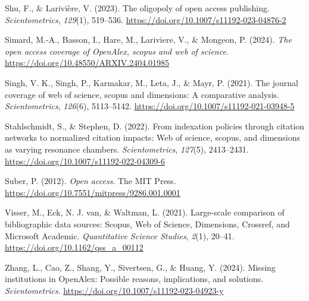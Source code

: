 \documentclass[a4paper,man,floatsintext,longtable,noextraspace,10pt]{apa6}
\newlength{\cslhangindent}
\newenvironment{CSLReferences}[2] %
{\begin{list}{}{%
  \setlength{\itemindent}{0pt}
  \setlength{\leftmargin}{0pt}
  \setlength{\parsep}{0pt}
  \ifodd #1
  \setlength{\leftmargin}{\cslhangindent}
  \setlength{\itemindent}{-1\cslhangindent}
  \fi
  \setlength{\itemsep}{#2\baselineskip}}}
{\end{list}}
\begin{document}
\begin{CSLReferences}{1}{0}
Shu, F., \& Larivière, V. (2023). The oligopoly of open access
publishing. \emph{Scientometrics}, \emph{129}(1), 519--536.
\url{https://doi.org/10.1007/s11192-023-04876-2}

Simard, M.-A., Basson, I., Hare, M., Lariviere, V., \& Mongeon, P.
(2024). \emph{The open access coverage of OpenAlex, scopus and web of
science}. \url{https://doi.org/10.48550/ARXIV.2404.01985}

Singh, V. K., Singh, P., Karmakar, M., Leta, J., \& Mayr, P. (2021). The
journal coverage of web of science, scopus and dimensions: A comparative
analysis. \emph{Scientometrics}, \emph{126}(6), 5113--5142.
\url{https://doi.org/10.1007/s11192-021-03948-5}

Stahlschmidt, S., \& Stephen, D. (2022). From indexation policies
through citation networks to normalized citation impacts: Web of
science, scopus, and dimensions as varying resonance chambers.
\emph{Scientometrics}, \emph{127}(5), 2413--2431.
\url{https://doi.org/10.1007/s11192-022-04309-6}

Suber, P. (2012). \emph{Open access}. The MIT Press.
\url{https://doi.org/10.7551/mitpress/9286.001.0001}

Visser, M., Eck, N. J. van, \& Waltman, L. (2021). Large-scale
comparison of bibliographic data sources: {Scopus, Web of Science,
Dimensions, Crossref, and Microsoft Academic}. \emph{Quantitative
Science Studies}, \emph{2}(1), 20--41.
\url{https://doi.org/10.1162/qss_a_00112}

Zhang, L., Cao, Z., Shang, Y., Sivertsen, G., \& Huang, Y. (2024).
Missing institutions in OpenAlex: Possible reasons, implications, and
solutions. \emph{Scientometrics}.
\url{https://doi.org/10.1007/s11192-023-04923-y}

\end{CSLReferences}
\end{document}
